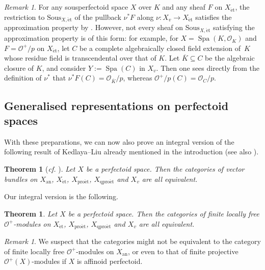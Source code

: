 \documentclass[10pt,a4paper]{article}
\newtheorem{Theorem}[thm]{Theorem}
\theoremstyle{definition}
\theoremstyle{remark}
\newtheorem{Remark}[thm]{Remark}
\renewcommand{\O}{\mathcal{O}}
\newcommand{\Spa}{\operatorname{Spa}}
\newcommand{\an}{{\mathrm{an}}}
\newcommand{\et}{{\operatorname{\acute{e}t}}}
\newcommand{\proet}{{\operatorname{pro\acute{e}t}}}
\newcommand{\qproet}{{\operatorname{qpro\acute{e}t}}}
\newcommand{\Sous}{\mathrm{Sous}}
\numberwithin{equation}{section}
\begin{document}
\begin{Remark}
	For any sousperfectoid space $X$ over $K$ and any sheaf $F$ on $X_\et$, the restriction to $\Sous_{X,\et}$ of the pullback $\nu^{\ast}F$ along $\nu\colon X_v\to X_{\et}$ satisfies the approximation property by \cite[Proposition 14.9]{etale-cohomology-of-diamonds}. However, not every sheaf on $\Sous_{X,\et}$  satisfying the approximation property is of this form: for example, for $X=\Spa(K,\O_K)$ and $F=\O^+/p$ on $X_\et$, let $C$ be a complete algebraically closed field extension of~$K$ whose residue field is transcendental over that of $K$. Let $\overline{K}\subseteq C$ be the algebraic closure of $K$, and consider $Y:=\Spa(C)$ in $X_v$. Then one sees directly from the definition of $\nu^\ast$ that $\nu^\ast F(C)=\O_{\overline{K}}/p$, whereas $\O^+/p(C)=\O_C/p$.
\end{Remark}

\subsection{Generalised representations on perfectoid spaces}



With these preparations, we can now also prove an integral version of the following result of Kedlaya--Liu  already mentioned in the introduction (see also \cite[Lemma~17.1.8]{ScholzeBerkeleyLectureNotes}). 

\begin{Theorem}[\textit{cf.} {\cite[Theorem 3.5.8]{KedlayaLiu-II}}]\label{t:loc-free-O-modules}
	Let $X$ be a perfectoid space. Then the categories of vector bundles on $X_{\an}$, $X_{\et}$,  $X_{\proet}$,  $X_{\qproet}$ and $X_{v}$ are all equivalent.
\end{Theorem}

Our integral version is the following. 

\begin{Theorem}\label{t:loc-free-O^+-modules}
	Let $X$ be a perfectoid space. Then the categories of finite locally free $\O^+$-modules on $X_{\et}$,  $X_{\proet}$,  $X_{\qproet}$ and $X_{v}$ are all equivalent.
\end{Theorem}

\begin{Remark}
	We suspect that the categories might not be equivalent to the category of finite locally free $\O^+$-modules on $X_{\an}$, or even to that of finite projective $\O^+(X)$-modules if $X$ is affinoid perfectoid.
\end{Remark}
\end{document}
